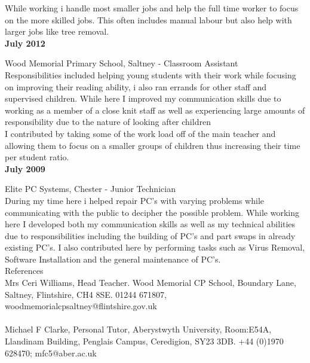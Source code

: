 \documentclass[10pt,a4paper]{article}
\begin{document}
\noindent
While working i handle most smaller jobs and help the full time worker to focus on the more skilled jobs. This often includes manual labour but also help with larger jobs like tree removal. \\

\noindent
\textbf{July 2012}

\noindent
Wood Memorial Primary School, Saltney - Classroom Assistant\\

\noindent
Responsibilities included helping young students with their work while focusing on improving their reading ability, i also ran errands for other staff and supervised children. While here I improved my communication skills due to working as a member of a close knit staff as well as experiencing large amounts of responsibility due to the nature of looking after children\\

\noindent
I contributed by taking some of the work load off of the main teacher and allowing them to focus on a smaller groups of children thus increasing their time per student ratio.\\

\noindent
\textbf{July 2009}

\noindent
Elite PC Systems, Chester - Junior Technician \\

\noindent
During my time here i helped  repair PC's with varying problems while communicating with the public to decipher the possible problem. While working here I developed both my communication skills as well as my technical abilities due to responsibilities including the building of PC's and part swaps in already existing PC's.
I also contributed here by performing tasks such as Virus Removal, Software Installation and the general maintenance of PC's.\\

\Large	
\noindent
References\\
\normalsize
Mrs Ceri Williams, Head Teacher. Wood Memorial CP School, Boundary Lane, Saltney, Flintshire, CH4 8SE. 01244 671807, wood\textunderscore memorial\textunderscore cp\textunderscore saltney@flintshire.gov.uk \\
\vspace{0.1cm}\\
\noindent
Michael F Clarke, Personal Tutor, Aberystwyth University, Room:E54A, Llandinam Building, Penglais Campus, Ceredigion, SY23 3DB. +44 (0)1970 628470; mfc5@aber.ac.uk
\end{document}
